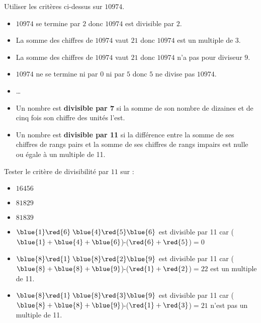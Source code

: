 \begin{exemple}[0.5]
	Utiliser les critères ci-dessus sur $\num{10974}$.
	\correction
	\vspace*{-5mm}
	\begin{itemize}
		\item $\num{10974}$ se termine par $2$ donc $\num{10974}$ est divisible par $2$.
		\item La somme des chiffres de $\num{10974}$ vaut $21$ donc $\num{10974}$ est un multiple de $3$.
		\item La somme des chiffres de $\num{10974}$ vaut $21$ donc $\num{10974}$ n'a pas pour diviseur $9$.
		\item $\num{10974}$ ne se termine ni par $0$ ni par $5$ donc $5$ ne divise pas $\num{10974}$.
		\item \dots		
	\end{itemize}
\end{exemple}
\begin{propriete}	
	\begin{itemize}
		\item Un nombre est \textbf{divisible par 7} si la somme de son nombre de dizaines et de cinq fois son chiffre des unités l'est.
		\item Un nombre est \textbf{divisible par 11} si la différence entre la somme de ses chiffres de rangs pairs et
	la somme de ses chiffres de rangs impairs est nulle ou égale à un multiple de 11.
	\end{itemize}
\end{propriete}

\begin{methode}
	\exercice 
	Tester le critère de divisibilité par $11$ sur :
	\begin{itemize}
		\item $\num{16456}$
		\item $\num{81829}$
		\item $\num{81839}$
	\end{itemize}
	\correction
	\vspace*{-5mm}
	\begin{itemize}
		\item $\blue{1}\red{6}\;\blue{4}\red{5}\blue{6}$ est divisible par 11 car ($\blue{1}+\blue{4}+\blue{6}$)-($\red{6}+\red{5}$)$=0$
		\item $\blue{8}\red{1}\;\blue{8}\red{2}\blue{9}$ est divisible par 11 car ($\blue{8}+\blue{8}+\blue{9}$)-($\red{1}+\red{2}$)$=22$ est un multiple de 11.
		\item $\blue{8}\red{1}\;\blue{8}\red{3}\blue{9}$ est divisible par 11 car ($\blue{8}+\blue{8}+\blue{9}$)-($\red{1}+\red{3}$)$=21$ n'est pas un multiple de 11.
	\end{itemize}
\end{methode}


